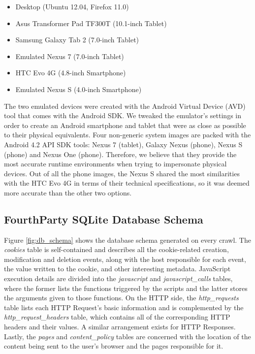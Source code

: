 \documentclass{acm_proc_article-sp}
\begin{document}
\begin{itemize}\itemsep0em 
\item Desktop (Ubuntu 12.04, Firefox 11.0)

\item Asus Transformer Pad TF300T (10.1-inch Tablet)

\item Samsung Galaxy Tab 2 (7.0-inch Tablet)

\item Emulated Nexus 7 (7.0-inch Tablet)

\item HTC Evo 4G (4.8-inch Smartphone)

\item Emulated Nexus S (4.0-inch Smartphone)
\end{itemize}

The two emulated devices were created with the Android Virtual Device (AVD) tool that comes with the Android SDK. We tweaked the emulator's settings in order to create an Android smartphone and tablet that were as close as possible to their physical equivalents. Four non-generic system images are packed with the Android 4.2 API SDK tools: Nexus 7 (tablet), Galaxy Nexus (phone), Nexus S (phone) and Nexus One (phone).  Therefore, we believe that they provide the most accurate runtime environments when trying to impersonate physical devices. Out of all the phone images, the Nexus S shared the most similarities with the HTC Evo 4G in terms of their technical specifications, so it was deemed more accurate than the other two options.

\subsection{FourthParty SQLite Database Schema}
Figure \ref{fig:db_schema} shows the database schema generated on every crawl. The \emph{cookies} table is self-contained and describes all the cookie-related creation, modification and deletion events, along with the host responsible for each event, the value written to the cookie, and other interesting metadata. JavaScript execution details are divided into the \emph{javascript} and \emph{javascript\_calls} tables, where the former lists the functions triggered by the scripts and the latter stores the arguments given to those functions. On the HTTP side, the \emph{http\_requests} table lists each HTTP Request's basic information and is complemented by the \emph{http\_request\_headers} table, which contains all of the corresponding HTTP headers and their values. A similar arrangement exists for HTTP Responses. Lastly, the \emph{pages} and \emph{content\_policy} tables are concerned with the location of the content being sent to the user's browser and the pages responsible for it.
\end{document}
